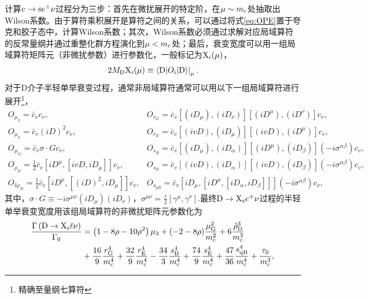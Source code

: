 计算$\mathrm{c}\to \mathrm{s} e^+\nu$过程分为三步：首先在微扰展开的特定阶，在$\mu\sim m_{\mathrm{c}}$处抽取出Wilson系数。由于算符乘积展开是算符之间的关系，可以通过将式\eqref{eq:OPE}置于夸克和胶子态中，计算Wilson系数；其次，Wilson系数必须通过求解对应局域算符的反常量纲并通过重整化群方程演化到$\mu<m_{\mathrm{c}}$处；最后，衰变宽度可以用一组局域算符矩阵元（非微扰参数）进行参数化，一般标记为$\mathrm{X}_i(\mu)$，
\begin{equation}
    \left.2 M_{\mathrm{D}} \mathrm{X}_i(\mu) \equiv\langle \mathrm{D}| O_i|\mathrm{D}\rangle\right|_\mu.
    \end{equation}
对于D介子半轻单举衰变过程，通常非局域算符通常可以用以下一组局域算符进行展开\footnote{精确至量纲七算符}，
\begin{equation}
    \begin{array}{ll}
    O_{\mu_3}=\bar{c}_v c_v, & O_{r_G}=\bar{c}_v\left[\left(i D_\mu\right),\left(i D_\nu\right)\right]\left[\left(i D^\mu\right),\left(i D^\nu\right)\right] c_v, \\
    O_{\mu_\pi}=\bar{c}_v(i D)^2 c_v, & O_{r_E}=\bar{c}_v\left[(i v D),\left(i D_\mu\right)\right]\left[(i v D),\left(i D^\mu\right)\right] c_v, \\
    O_{\mu_G}=\bar{c}_v \sigma \cdot G c_v, & O_{s_B}=\bar{c}_v\left[\left(i D_\mu\right),\left(i D_\alpha\right)\right]\left[\left(i D^\mu\right),\left(i D_\beta\right)\right]\left(-i \sigma^{\alpha \beta}\right) c_v, \\
    O_{\rho_D}=\frac{1}{2} \bar{c}_v\left[i D^\mu,\left[i v D, i D_\mu\right]\right] c_v, & O_{s_E}=\bar{c}_v\left[(i v D),\left(i D_\alpha\right)\right]\left[(i v D),\left(i D_\beta\right)\right]\left(-i \sigma^{\alpha \beta}\right) c_v, \\
    O_{\delta \rho_D}=\frac{1}{2} \bar{c}_v\left[i D^\mu,\left[(i D)^2, i D_\mu\right]\right] c_v, & O_{s_{q B}}=\bar{c}_v\left[i D_\mu,\left[i D^\mu,\left[i D_\alpha, i D_\beta\right]\right]\right]\left(-i \sigma^{\alpha \beta}\right) c_v,
    \end{array}
    \end{equation}
其中，$\sigma \cdot G \equiv-i \sigma^{\mu \nu}\left(i D_\mu\right)\left(i D_\nu\right)$，$\sigma^{\mu \nu}=\frac{i}{2}\left[\gamma^\mu, \gamma^\nu\right]$.最终$\mathrm{D}\to \mathrm{X}_{\mathrm{s}}e^{+}\nu$过程的半轻单举衰变宽度用该组局域算符的非微扰矩阵元参数化为
\begin{equation}
    \begin{aligned}
    \frac{\Gamma\left(\mathrm{D} \rightarrow \mathrm{X}_{\mathrm{s}} \ell \nu\right)}{\Gamma_0} & = \left(1 - 8 \rho - 10 \rho^2\right) \mu_3 + (-2 - 8 \rho) \frac{\mu_{\mathrm{G}}^2}{m_{\mathrm{c}}^2} + 6 \frac{\tilde{\rho}_{\mathrm{D}}^3}{m_{\mathrm{c}}^3} \\
    & + \frac{16}{9} \frac{r_{\mathrm{G}}^4}{m_{\mathrm{c}}^4} + \frac{32}{9} \frac{r_{\mathrm{E}}^4}{m_{\mathrm{c}}^4} - \frac{34}{3} \frac{s_{\mathrm{B}}^4}{m_{\mathrm{c}}^4} + \frac{74}{9} \frac{s_{\mathrm{E}}^4}{m_{\mathrm{c}}^4} + \frac{47}{36} \frac{s_{\mathrm{qB}}^4}{m_{\mathrm{c}}^4} + \frac{\tau_0}{m_{\mathrm{c}}^3},
    \end{aligned}
\end{equation}

